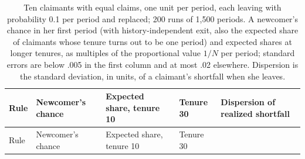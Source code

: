 \documentclass[
  11pt,
  letterpaper,
  DIV=11,
  numbers=noendperiod,
  twoside]{scrartcl}
\begin{document}
\begin{longtable}[]{@{}
  >{\raggedright\arraybackslash}p{}
  >{\raggedright\arraybackslash}p{}
  >{\raggedright\arraybackslash}p{}
  >{\raggedright\arraybackslash}p{}
  >{\raggedright\arraybackslash}p{}@{}}
\caption{Ten claimants with equal claims, one unit per period, each
leaving with probability 0.1 per period and replaced; 200 runs of 1,500
periods. A newcomer's chance in her first period (with
history-independent exit, also the expected share of claimants whose
tenure turns out to be one period) and expected shares at longer
tenures, as multiples of the proportional value \(1/N\) per period;
standard errors are below .005 in the first column and at most .02
elsewhere. Dispersion is the standard deviation, in units, of a
claimant's shortfall when she leaves.}\label{tbl-churn}\tabularnewline
\toprule\noalign{}
\begin{minipage}[b]{\linewidth}\raggedright
Rule
\end{minipage} & \begin{minipage}[b]{\linewidth}\raggedright
Newcomer's chance
\end{minipage} & \begin{minipage}[b]{\linewidth}\raggedright
Expected share, tenure 10
\end{minipage} & \begin{minipage}[b]{\linewidth}\raggedright
Tenure 30
\end{minipage} & \begin{minipage}[b]{\linewidth}\raggedright
Dispersion of realized shortfall
\end{minipage} \\
\midrule\noalign{}
\endfirsthead
\toprule\noalign{}
\begin{minipage}[b]{\linewidth}\raggedright
Rule
\end{minipage} & \begin{minipage}[b]{\linewidth}\raggedright
Newcomer's chance
\end{minipage} & \begin{minipage}[b]{\linewidth}\raggedright
Expected share, tenure 10
\end{minipage} & \begin{minipage}[b]{\linewidth}\raggedright
Tenure 30
\end{minipage} & \begin{minipage}[b]{\linewidth}\raggedright

\end{minipage}
\end{longtable}
\end{document}
